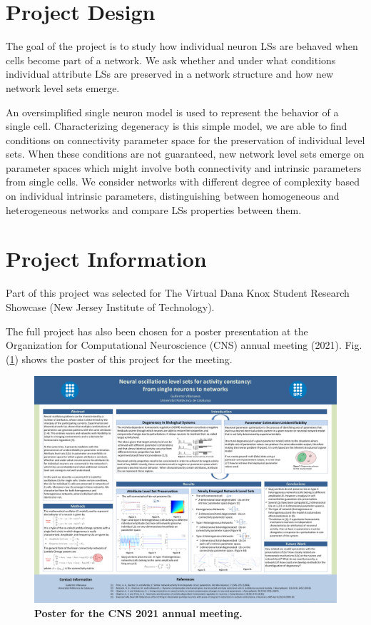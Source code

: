 \section{Project Design}
The goal of the project is to study how individual neuron LSs are behaved when cells become part of a network. We ask whether and under what conditions individual attribute LSs are preserved in a network structure and how new network level sets emerge.

An oversimplified single neuron model is used to represent the behavior of a single cell. Characterizing degeneracy is this simple model, we are able to find conditions on connectivity parameter space for the preservation of individual level sets.  When these conditions are not guaranteed, new network level sets emerge on parameter spaces which might involve both connectivity and intrinsic parameters from single cells. We consider networks with  different degree of complexity based on individual intrinsic parameters, distinguishing between homogeneous and heterogeneous networks and compare LSs properties between them. 

\section{Project Information}
Part of this project was selected for The Virtual Dana Knox Student Research Showcase (New Jersey Institute of Technology).

The full project has also been chosen for a poster presentation at the Organization for Computational Neuroscience (CNS) annual meeting (2021). Fig. (\ref{photonew33}) shows the poster of this project for the meeting.

\begin{figure}[htb]
\centering
    \includegraphics[width=1\linewidth]{Images/poster.pdf} 
  \caption{\textbf{Poster for the CNS 2021 annual meeting.}}
  \label{photonew33}
\end{figure}

